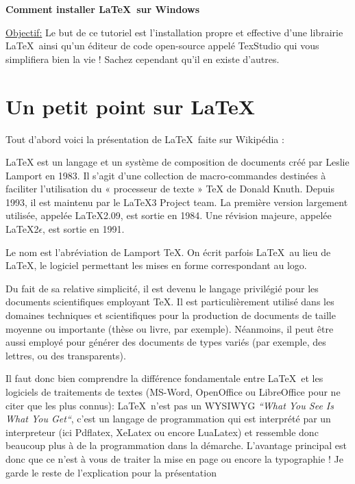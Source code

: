 \documentclass[11pt,a4paper]{article} %
\begin{document}
\begin{center}
{\huge \textbf{Comment installer \LaTeX\ sur Windows}}
\end{center}

\uline{Objectif:} Le but de ce tutoriel est l'installation propre et effective d'une librairie \LaTeX\ ainsi qu'un éditeur de code open-source appelé TexStudio qui vous simplifiera bien la vie ! Sachez cependant qu'il en existe d'autres.

\section{Un petit point sur \LaTeX}
Tout d'abord voici la présentation de \LaTeX\ faite sur Wikipédia :

\begin{mdframed}[style=exampledefault]
LaTeX est un langage et un système de composition de documents créé par Leslie Lamport en 1983. Il s'agit d'une collection de macro-commandes destinées à faciliter l'utilisation du « processeur de texte » TeX de Donald Knuth. Depuis 1993, il est maintenu par le LaTeX3 Project team. La première version largement utilisée, appelée LaTeX2.09, est sortie en 1984. Une révision majeure, appelée LaTeX2$\epsilon$, est sortie en 1991.

Le nom est l'abréviation de Lamport TeX. On écrit parfois \LaTeX\ au lieu de LaTeX, le logiciel permettant les mises en forme correspondant au logo.

Du fait de sa relative simplicité, il est devenu le langage privilégié pour les documents scientifiques employant TeX. Il est particulièrement utilisé dans les domaines techniques et scientifiques pour la production de documents de taille moyenne ou importante (thèse ou livre, par exemple). Néanmoins, il peut être aussi employé pour générer des documents de types variés (par exemple, des lettres, ou des transparents).
\end{mdframed}

Il faut donc bien comprendre la différence fondamentale entre \LaTeX\ et les logiciels de traitements de textes (MS-Word, OpenOffice ou LibreOffice pour ne citer que les plus connus): \LaTeX\ n'est pas un WYSIWYG \textit{``What You See Is What You Get``}, c'est un langage de programmation qui est interprété par un interpreteur (ici Pdflatex, XeLatex ou encore LuaLatex) et ressemble donc beaucoup plus à de la programmation dans la démarche. L'avantage principal est donc que ce n'est à vous de traiter la mise en page ou encore la typographie ! Je garde le reste de l'explication pour la présentation \smiley{}
\end{document}

